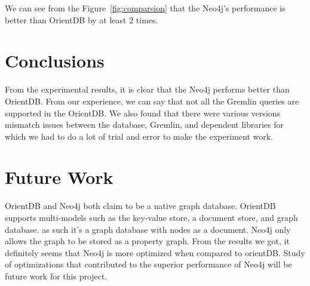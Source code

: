 We can see from the Figure~\ref{fig:comparsion} that the Neo4j's performance is better than OrientDB by at least 2 times.



\section{Conclusions}
From the experimental results, it is clear that the Neo4j performs better than OrientDB. From our experience, we can say that not all the Gremlin queries are supported in the OrientDB. We also found that there were various versions mismatch issues between the database, Gremlin, and dependent libraries for which we had to do a lot of trial and error to make the experiment work.

\section{Future Work}
OrientDB and Neo4j both claim to be a native graph database. OrientDB supports multi-models such as the key-value store, a document store, and graph database. as such it's a graph database with nodes as a document. Neo4j only allows the graph to be stored as a property graph. From the results we got, it definitely seems that Neo4j is more optimized when compared to orientDB. Study of optimizations that contributed to the superior performance of Neo4j will be future work for this project.